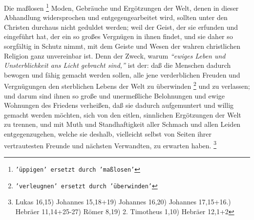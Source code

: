Die maßlosen
\footnote{\texttt{'üppigen' ersetzt durch 'maßlosen'}}
Moden, Gebräuche und Ergötzungen der Welt, denen in dieser
Abhandlung widersprochen und entgegengearbeitet wird, sollten unter den Christen
durchaus nicht geduldet werden; weil der Geist, der sie erfunden und eingeführt
hat, der ein so großes Vergnügen in ihnen findet, und sie daher so sorgfältig in
Schutz nimmt, mit dem Geiste und Wesen der wahren christlichen Religion ganz
unvereinbar ist. Denn der Zweck, warum
\textit{"`ewiges Leben und Unsterblichkeit ans
Licht gebracht sind,"'} ist der: daß die Menschen dadurch bewogen und fähig
gemacht werden sollen, alle jene verderblichen Freuden und Vergnügungen den
sterblichen Lebens der Welt zu überwinden
\footnote{\texttt{'verleugnen' ersetzt durch 'überwinden'}}
und zu verlassen; und darum sind ihnen
so große und unermeßliche Belohnungen und ewige
Wohnungen des Friedens
verheißen, daß sie dadurch aufgemuntert und willig gemacht werden möchten, sich
von den eitlen, sinnlichen Ergötzungen der Welt zu trennen, und mit Muth und
Standhaftigkeit aller Schmach und allen Leiden entgegenzugehen, welche sie
deshalb, vielleicht selbst von Seiten ihrer vertrautesten Freunde und nächsten
Verwandten, zu erwarten haben.
\footnote{
Lukas 16,15)
Johannes 15,18+19)
Johannes 16,20)
Johannes 17,15+16.)
Hebräer 11,14+25-27)
Römer 8,19)
2. Timotheus 1,10)
Hebräer 12,1+2 }


\medskip

